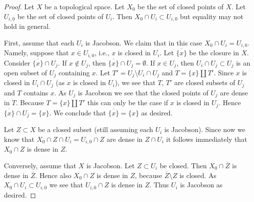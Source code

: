 \documentclass[10pt,a4paper]{amsart}
\theoremstyle{plain}
\theoremstyle{definition}
\theoremstyle{remark}
\numberwithin{equation}{subsection}
\begin{document}
\begin{proof}
Let $X$ be a topological space.
Let $X_0$ be the set of closed points of $X$.
Let $U_{i, 0}$ be the set of closed points of
$U_i$. Then $X_0 \cap U_i \subset U_{i, 0}$
but equality may not hold in general.

\medskip\noindent
First, assume that each $U_i$ is Jacobson.
We claim that in this case $X_0 \cap U_i = U_{i, 0}$.
Namely, suppose that $x \in U_{i, 0}$, i.e., $x$ is closed in
$U_i$. Let $\overline{\{x\}}$ be the closure
in $X$. Consider $\overline{\{x\}} \cap U_j$.
If $x \not \in U_j$, then $\overline{\{x\}} \cap U_j = \emptyset$.
If $x \in U_j$, then $U_i \cap U_j \subset U_j$
is an open subset of $U_j$ containing $x$.
Let $T' = U_j \setminus U_i \cap U_j$ and
$T = \{x\} \amalg T'$. Since $x$ is closed in $U_i \cap U_j$
(as $x$ is closed in $U_i$), we see that $T$, $T'$
are closed subsets of $U_j$ and $T$ contains
$x$. As $U_j$ is Jacobson we see that the closed points of
$U_j$ are dense in $T$. Because $T = \{x\} \amalg T'$
this can only be the case if $x$ is closed in $U_j$.
Hence $\overline{\{x\}} \cap U_j = \{x\}$. We conclude
that $\overline{\{x\}} = \{ x \}$ as desired.

\medskip\noindent
Let $Z \subset X$ be a closed subset (still
assuming each $U_i$ is Jacobson).
Since now we know that $X_0 \cap Z  \cap U_i
= U_{i, 0} \cap Z$ are dense in $Z \cap U_i$
it follows immediately that $X_0 \cap Z$ is
dense in $Z$.

\medskip\noindent
Conversely, assume that $X$ is Jacobson.
Let $Z \subset U_i$ be closed. Then
$X_0 \cap \overline{Z}$ is dense in $\overline{Z}$.
Hence also $X_0 \cap Z$ is dense in $Z$, because
$\overline{Z} \setminus Z$ is closed. As $X_0 \cap U_i
\subset U_{i, 0}$ we see that
$U_{i, 0} \cap Z$ is dense in $Z$.
Thus $U_i$ is Jacobson as desired.
\end{proof}
\end{document}
